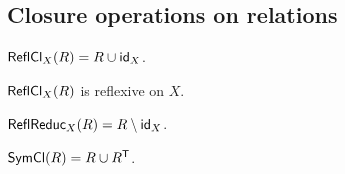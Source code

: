 


\subsection{Closure operations on relations}

\begin{definition}\label{reflexive_closure}
    $\operatorname{\mathsf{ReflCl}}_{X}(R) = R\cup\operatorname{\mathsf{id}}_{X}$.
\end{definition}

\begin{proposition}\label{reflexive_closure_is_reflexive}
    $\operatorname{\mathsf{ReflCl}}_{X}(R)$ is reflexive on $X$.
\end{proposition}

\begin{definition}\label{reflexive_reduction}
    $\operatorname{\mathsf{ReflReduc}}_{X}(R) = R\setminus\operatorname{\mathsf{id}}_{X}$.
\end{definition}

\begin{definition}\label{symmetric_closure}
    $\operatorname{\mathsf{SymCl}}(R) = R\cup{R^{\mathsf{T}}}$.
\end{definition}




